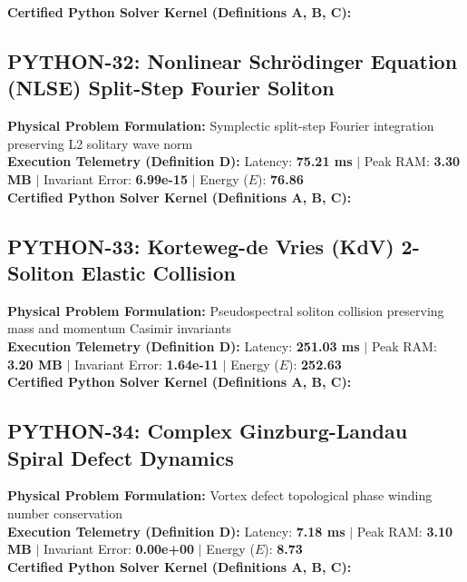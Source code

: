 \textbf{Certified Python Solver Kernel (Definitions A, B, C):}


\vspace{1em}
\subsection{PYTHON-32: Nonlinear Schrödinger Equation (NLSE) Split-Step Fourier Soliton}
\textbf{Physical Problem Formulation:} Symplectic split-step Fourier integration preserving L2 solitary wave norm\\
\textbf{Execution Telemetry (Definition D):} Latency: \textbf{75.21 ms} $|$ Peak RAM: \textbf{3.30 MB} $|$ Invariant Error: \textbf{6.99e-15} $|$ Energy ($E$): \textbf{76.86}\\

\textbf{Certified Python Solver Kernel (Definitions A, B, C):}


\vspace{1em}
\subsection{PYTHON-33: Korteweg-de Vries (KdV) 2-Soliton Elastic Collision}
\textbf{Physical Problem Formulation:} Pseudospectral soliton collision preserving mass and momentum Casimir invariants\\
\textbf{Execution Telemetry (Definition D):} Latency: \textbf{251.03 ms} $|$ Peak RAM: \textbf{3.20 MB} $|$ Invariant Error: \textbf{1.64e-11} $|$ Energy ($E$): \textbf{252.63}\\

\textbf{Certified Python Solver Kernel (Definitions A, B, C):}


\vspace{1em}
\subsection{PYTHON-34: Complex Ginzburg-Landau Spiral Defect Dynamics}
\textbf{Physical Problem Formulation:} Vortex defect topological phase winding number conservation\\
\textbf{Execution Telemetry (Definition D):} Latency: \textbf{7.18 ms} $|$ Peak RAM: \textbf{3.10 MB} $|$ Invariant Error: \textbf{0.00e+00} $|$ Energy ($E$): \textbf{8.73}\\

\textbf{Certified Python Solver Kernel (Definitions A, B, C):}



